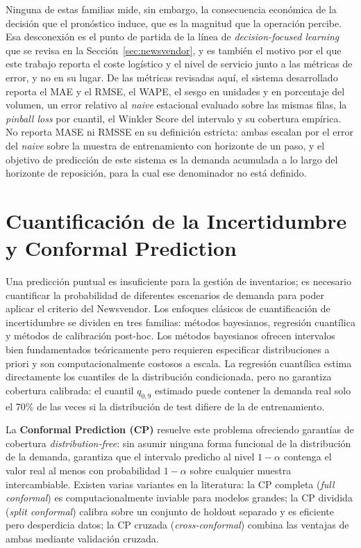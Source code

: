 Ninguna de estas familias mide, sin embargo, la consecuencia económica de la decisión que el
pronóstico induce, que es la magnitud que la operación percibe. Esa desconexión es el punto de
partida de la línea de \textit{decision-focused learning} que se revisa en la
Sección~\ref{sec:newsvendor}, y es también el motivo por el que este trabajo reporta el coste
logístico y el nivel de servicio junto a las métricas de error, y no en su lugar. De las
métricas revisadas aquí, el sistema desarrollado reporta el MAE y el RMSE, el WAPE, el sesgo en
unidades y en porcentaje del volumen, un error relativo al \textit{naive} estacional evaluado
sobre las mismas filas, la \textit{pinball loss} por cuantil, el Winkler Score del intervalo y
su cobertura empírica. No reporta MASE ni RMSSE en su definición estricta: ambas escalan por el
error del \textit{naive} sobre la muestra de entrenamiento con horizonte de un paso, y el
objetivo de predicción de este sistema es la demanda acumulada a lo largo del horizonte de
reposición, para la cual ese denominador no está definido.

\section{Cuantificación de la Incertidumbre y Conformal Prediction}
Una predicción puntual es insuficiente para la gestión de inventarios; es necesario cuantificar la probabilidad de diferentes escenarios de demanda para poder aplicar el criterio del Newsvendor. Los enfoques clásicos de cuantificación de incertidumbre se dividen en tres familias: métodos bayesianos, regresión cuantílica y métodos de calibración post-hoc. Los métodos bayesianos \cite{hyndman2021forecasting} ofrecen intervalos bien fundamentados teóricamente pero requieren especificar distribuciones a priori y son computacionalmente costosos a escala. La regresión cuantílica \cite{koenker2005quantile} estima directamente los cuantiles de la distribución condicionada, pero no garantiza cobertura calibrada: el cuantil $q_{0{,}9}$ estimado puede contener la demanda real solo el 70\% de las veces si la distribución de test difiere de la de entrenamiento.

La \textbf{Conformal Prediction (CP)} \cite{angelopoulos2021gentle, vovk2005algorithmic} resuelve este problema ofreciendo garantías de cobertura \textit{distribution-free}: sin asumir ninguna forma funcional de la distribución de la demanda, garantiza que el intervalo predicho al nivel $1-\alpha$ contenga el valor real al menos con probabilidad $1-\alpha$ sobre cualquier muestra intercambiable. Existen varias variantes en la literatura: la CP completa (\textit{full conformal}) es computacionalmente inviable para modelos grandes; la CP dividida (\textit{split conformal}) calibra sobre un conjunto de holdout separado y es eficiente pero desperdicia datos; la CP cruzada (\textit{cross-conformal}) combina las ventajas de ambas mediante validación cruzada.

